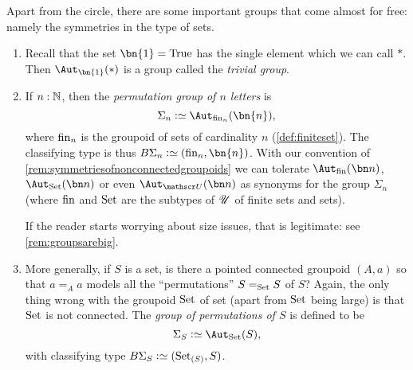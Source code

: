 \begin{example}\label{ex:groups}
  Apart from the circle, there are some important groups that come almost for free: 
namely the symmetries in the type of sets.
  \begin{enumerate}
  \item Recall that the set $\bn{1} =\true$ has the single element which we can call $*$. Then $\aut_{\bn{1} }(*)$ is a group called the \emph{trivial group}.
  \item If $n:\mathbb{N}$, then the \emph{permutation group of $n$ letters} is
$$\Sigma_n\defequi\aut_{\fin_n}(\bn{n} ),$$
where $\fin_n$ is the groupoid of sets of cardinality $n$ (\cf \ref{def:finiteset}).
The classifying type is thus $B\Sigma_n\defequi (\fin_n,\bn{n})$.
With our convention of \cref{rem:symmetriesofnonconnectedgroupoids} we can tolerate $\aut_{\fin}(\bn n)$, $\aut_{\Set}(\bn n)$ or even $\aut_{\UU}(\bn n)$ as synonyms for the group $\Sigma_n$ (where $\fin$ and $\mathrm{Set}$ are the subtypes of ${\mathscr{U}}$ of finite sets and sets).

If the reader starts worrying about size issues, that is legitimate: see \cref{rem:groupsarebig}.
 \item More generally, if $S$ is a set, is there a pointed connected groupoid $(A,a)$ so that $a=_Aa$ models all the ``permutations'' $S=_{\mathrm{Set}}S$ of $S$?  Again, the only thing wrong with the groupoid $\mathrm{Set}$ of set (apart from $\mathrm{Set}$ being large) is that $\mathrm{Set}$ is not connected.
 The \emph{group of permutations of $S$} is defined to be
$$\Sigma_{S}\defequi\aut_{\Set}(S),$$
with classifying type $B\Sigma_S\defequi(\conncomp \Set S,S)$.
  \end{enumerate}
\end{example}

